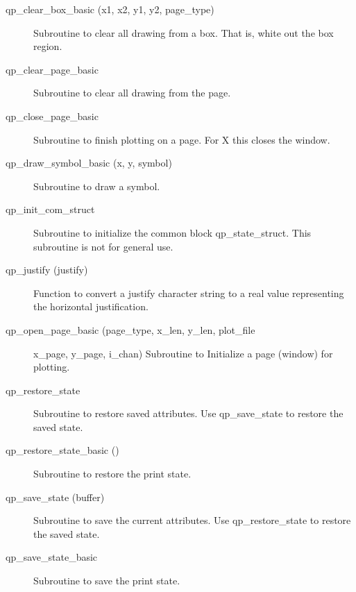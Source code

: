 \begin{description}

\item[qp\_clear\_box\_basic (x1, x2, y1, y2, page\_type)] \Newline 
Subroutine to clear all drawing from a box.
That is, white out the box region.

\item[qp\_clear\_page\_basic] \Newline 
Subroutine to clear all drawing from the page.

\item[qp\_close\_page\_basic] \Newline 
Subroutine to finish plotting on a page.
For X this closes the window.

\item[qp\_draw\_symbol\_basic (x, y, symbol)] \Newline 
Subroutine to draw a symbol.

\item[qp\_init\_com\_struct ] \Newline 
Subroutine to initialize the common block qp\_state\_struct.
This subroutine is not for general use.

\item[qp\_justify (justify)] \Newline 
     Function to convert a justify character string to a real value
     representing the horizontal justification. 

\item[qp\_open\_page\_basic (page\_type, x\_len, y\_len, plot\_file] \Newline 
      x\_page, y\_page, i\_chan)
Subroutine to Initialize a page (window) for plotting.

\item[qp\_restore\_state] \Newline 
     Subroutine to restore saved attributes. 
     Use qp\_save\_state to restore the saved state.

\item[qp\_restore\_state\_basic ()] \Newline 
Subroutine to restore the print state.

\item[qp\_save\_state (buffer)] \Newline 
     Subroutine to save the current attributes. 
     Use qp\_restore\_state to restore the saved state.

\item[qp\_save\_state\_basic ] \Newline 
Subroutine to save the print state.


\end{description}
